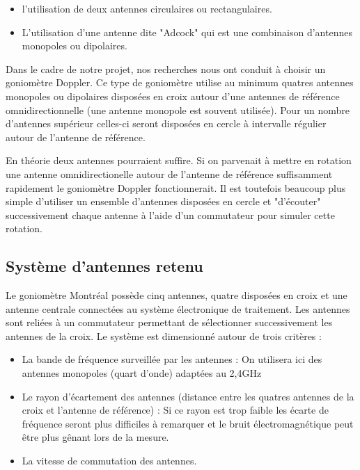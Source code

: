 \begin{itemize}

\item l'utilisation de deux antennes circulaires ou rectangulaires.

\item L'utilisation d'une antenne dite "Adcock" qui est une combinaison d'antennes monopoles ou dipolaires. 

\end{itemize} 

	Dans le cadre de notre projet, nos recherches nous ont conduit à choisir un goniomètre Doppler. Ce type de goniomètre utilise au minimum quatres antennes monopoles ou dipolaires disposées en croix autour d'une antennes de référence omnidirectionnelle (une antenne monopole est souvent utilisée). Pour un nombre d'antennes supérieur celles-ci seront disposées en cercle à intervalle régulier autour de l'antenne de référence.	
	
	En théorie deux antennes pourraient suffire. Si on parvenait à mettre en rotation une antenne omnidirectionelle autour de l'antenne de référence suffisamment rapidement le goniomètre Doppler fonctionnerait. Il est toutefois beaucoup plus simple d'utiliser un ensemble d'antennes disposées en cercle et "d'écouter" successivement chaque antenne à l'aide d'un commutateur pour simuler cette rotation.
	
\subsection{Système d'antennes retenu}

	Le goniomètre Montréal possède cinq antennes, quatre disposées en croix et une antenne centrale connectées au système électronique de traitement. Les antennes sont reliées à un commutateur permettant de sélectionner successivement les antennes de la croix. Le système est dimensionné autour de trois critères : 
	
\begin{itemize}

\item La bande de fréquence surveillée par les antennes : On utilisera ici des antennes monopoles (quart d'onde) adaptées au 2,4GHz

\item Le rayon d'écartement des antennes (distance entre les quatres antennes de la croix et l'antenne de référence) : Si ce rayon est trop faible les écarte de fréquence seront plus difficiles à remarquer et le bruit électromagnétique peut être plus gênant lors de la mesure.


\item La vitesse de commutation des antennes.

\end{itemize}

